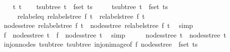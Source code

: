 \begin{isabellebody}
%
\isadelimproof
%
\endisadelimproof
%
\isatagproof
{}\isamarkupfalse%
\isanewline
\ \ \isamarkupfalse%
\ t{}\ t{}\isanewline
\ \ \isamarkupfalse%
\ t{}{\isacharunderscore}{\kern0pt}subtree{\isacharcolon}{\kern0pt}\ {\isachardoublequoteopen}t{}\ {\isasymin}\ fset\ ts{\isachardoublequoteclose}\isanewline
\ \ \ \ \ t{}{\isacharunderscore}{\kern0pt}subtree{\isacharcolon}{\kern0pt}\ {\isachardoublequoteopen}t{}\ {\isasymin}\ fset\ ts{\isachardoublequoteclose}\isanewline
\ \ \ \ \ relabel{\isacharunderscore}{\kern0pt}eq{\isacharcolon}{\kern0pt}\ {\isachardoublequoteopen}relabel{\isacharunderscore}{\kern0pt}stree\ f\ t{}\ {\isacharequal}{\kern0pt}\ relabel{\isacharunderscore}{\kern0pt}stree\ f\ t{}{\isachardoublequoteclose}\isanewline
\ \ \isamarkupfalse%
\ \isamarkupfalse%
\ {\isachardoublequoteopen}nodes{\isacharunderscore}{\kern0pt}stree\ {\isacharparenleft}{\kern0pt}relabel{\isacharunderscore}{\kern0pt}stree\ f\ t{}{\isacharparenright}{\kern0pt}\ {\isacharequal}{\kern0pt}\ nodes{\isacharunderscore}{\kern0pt}stree\ {\isacharparenleft}{\kern0pt}relabel{\isacharunderscore}{\kern0pt}stree\ f\ t{}{\isacharparenright}{\kern0pt}{\isachardoublequoteclose}\ \isamarkupfalse%
\ simp\isanewline
\ \ \isamarkupfalse%
\ \isamarkupfalse%
\ {\isachardoublequoteopen}f\ {\isacharbackquote}{\kern0pt}\ nodes{\isacharunderscore}{\kern0pt}stree\ t{}\ {\isacharequal}{\kern0pt}\ f\ {\isacharbackquote}{\kern0pt}\ nodes{\isacharunderscore}{\kern0pt}stree\ t{}{\isachardoublequoteclose}\ \isamarkupfalse%
\ simp\isanewline
\ \ \isamarkupfalse%
\ \isamarkupfalse%
\ {\isachardoublequoteopen}nodes{\isacharunderscore}{\kern0pt}stree\ t{}\ {\isacharequal}{\kern0pt}\ nodes{\isacharunderscore}{\kern0pt}stree\ t{}{\isachardoublequoteclose}\ \isamarkupfalse%
\ inj{\isacharunderscore}{\kern0pt}on{\isacharunderscore}{\kern0pt}nodes\ t{}{\isacharunderscore}{\kern0pt}subtree\ t{}{\isacharunderscore}{\kern0pt}subtree\ inj{\isacharunderscore}{\kern0pt}on{\isacharunderscore}{\kern0pt}image{\isacharbrackleft}{\kern0pt}of\ f\ {\isachardoublequoteopen}nodes{\isacharunderscore}{\kern0pt}stree\ {\isacharbackquote}{\kern0pt}\ fset\ ts{\isachardoublequoteclose}{\isacharbrackright}{\kern0pt}\isanewline

\end{isabellebody}
